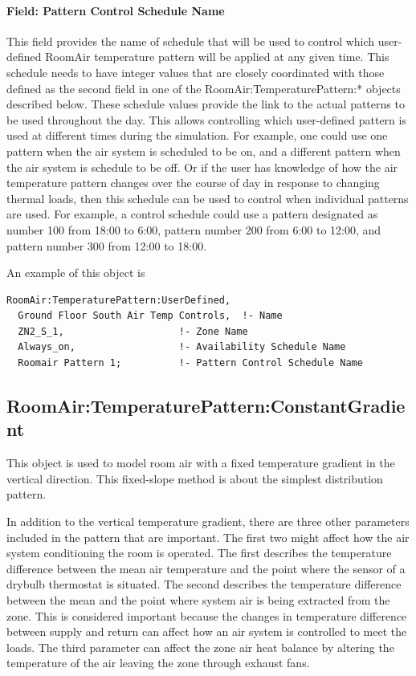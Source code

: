 \paragraph{Field: Pattern Control Schedule Name}\label{field-pattern-control-schedule-name}

This field provides the name of schedule that will be used to control which user-defined RoomAir temperature pattern will be applied at any given time. This schedule needs to have integer values that are closely coordinated with those defined as the second field in one of the RoomAir:TemperaturePattern:* objects described below. These schedule values provide the link to the actual patterns to be used throughout the day. This allows controlling which user-defined pattern is used at different times during the simulation. For example, one could use one pattern when the air system is scheduled to be on, and a different pattern when the air system is schedule to be off. Or if the user has knowledge of how the air temperature pattern changes over the course of day in response to changing thermal loads, then this schedule can be used to control when individual patterns are used. For example, a control schedule could use a pattern designated as number 100 from 18:00 to 6:00, pattern number 200 from 6:00 to 12:00, and pattern number 300 from 12:00 to 18:00.

An example of this object is

\begin{lstlisting}
RoomAir:TemperaturePattern:UserDefined,
  Ground Floor South Air Temp Controls,  !- Name
  ZN2_S_1,                    !- Zone Name
  Always_on,                  !- Availability Schedule Name
  Roomair Pattern 1;          !- Pattern Control Schedule Name
\end{lstlisting}

\subsection{RoomAir:TemperaturePattern:ConstantGradient}\label{roomairtemperaturepatternconstantgradient}

This object is used to model room air with a fixed temperature gradient in the vertical direction. This fixed-slope method is about the simplest distribution pattern.

In addition to the vertical temperature gradient, there are three other parameters included in the pattern that are important. The first two might affect how the air system conditioning the room is operated. The first describes the temperature difference between the mean air temperature and the point where the sensor of a drybulb thermostat is situated. The second describes the temperature difference between the mean and the point where system air is being extracted from the zone. This is considered important because the changes in temperature difference between supply and return can affect how an air system is controlled to meet the loads. The third parameter can affect the zone air heat balance by altering the temperature of the air leaving the zone through exhaust fans.

